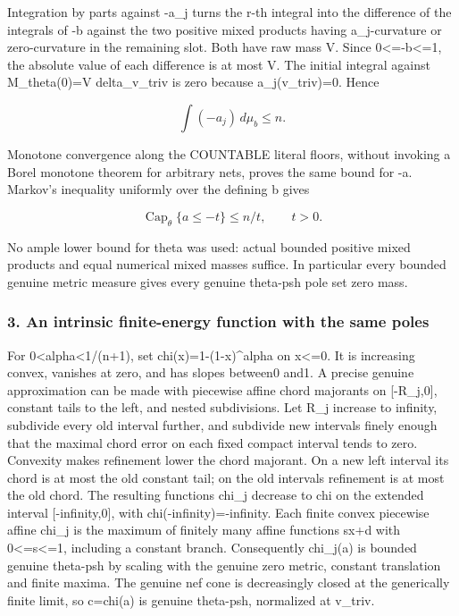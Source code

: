 \documentclass[
]{article}
\begin{document}
Integration by parts against -a\_j turns the r-th integral into the
difference of the integrals of -b against the two positive mixed
products having a\_j-curvature or zero-curvature in the remaining slot.
Both have raw mass V. Since 0\textless=-b\textless=1, the absolute value
of each difference is at most V. The initial integral against
M\_theta(0)=V delta\_v\_triv is zero because a\_j(v\_triv)=0. Hence

\[\int(-a_j)\,d\mu_b\leq n.\]

Monotone convergence along the COUNTABLE literal floors, without
invoking a Borel monotone theorem for arbitrary nets, proves the same
bound for -a. Markov's inequality uniformly over the defining b gives

\[\operatorname{Cap}_\theta\{a\leq-t\}\leq n/t,\qquad t>0.\tag{1}\]

No ample lower bound for theta was used: actual bounded positive mixed
products and equal numerical mixed masses suffice. In particular every
bounded genuine metric measure gives every genuine theta-psh pole set
zero mass.

\subsubsection{3. An intrinsic finite-energy function with the same
poles}\label{an-intrinsic-finite-energy-function-with-the-same-poles}

For 0\textless alpha\textless1/(n+1), set chi(x)=1-(1-x)\^{}alpha on
x\textless=0. It is increasing convex, vanishes at zero, and has slopes
between0 and1. A precise genuine approximation can be made with
piecewise affine chord majorants on {[}-R\_j,0{]}, constant tails to the
left, and nested subdivisions. Let R\_j increase to infinity, subdivide
every old interval further, and subdivide new intervals finely enough
that the maximal chord error on each fixed compact interval tends to
zero. Convexity makes refinement lower the chord majorant. On a new left
interval its chord is at most the old constant tail; on the old
intervals refinement is at most the old chord. The resulting functions
chi\_j decrease to chi on the extended interval {[}-infinity,0{]}, with
chi(-infinity)=-infinity. Each finite convex piecewise affine chi\_j is
the maximum of finitely many affine functions sx+d with
0\textless=s\textless=1, including a constant branch. Consequently
chi\_j(a) is bounded genuine theta-psh by scaling with the genuine zero
metric, constant translation and finite maxima. The genuine nef cone is
decreasingly closed at the generically finite limit, so c=chi(a) is
genuine theta-psh, normalized at v\_triv.
\end{document}
